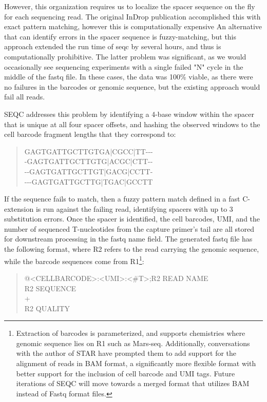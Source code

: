 However, this organization requires us to localize the spacer sequence on the fly for each sequencing read. 
The original InDrop publication accomplished this with exact pattern matching, however this is computationally expensive
An alternative that can identify errors in the spacer sequence is fuzzy-matching, but this approach extended the run time of seqc by several hours, and thus is computationally prohibitive.  
The latter problem was significant, as we would occasionally see sequencing experiments with a single failed "N" cycle in the middle of the fastq file. 
In these cases, the data was 100\% viable, as there were no failures in the barcodes or genomic sequence, but the existing approach would fail all reads. 

SEQC addresses this problem by identifying a 4-base window within the spacer that is unique at all four spacer offsets, and hashing the observed windows to the cell barcode fragment lengths that they correspond to: 
\begin{quote}
\onehalfspacing
{\mono
  GAGTGATTGCTTGTGA|CGCC|TT-{}-{}-\\ %
  -GAGTGATTGCTTGTG|ACGC|CTT-{}-\\ 
  -{}-GAGTGATTGCTTGT|GACG|CCTT-\\ 
  -{}-{}-GAGTGATTGCTTG|TGAC|GCCTT
}
\end{quote}
If the sequence fails to match, then a fuzzy pattern match defined in a fast C-extension is run against the failing read, identifying spacers with up to 3 substitution errors. 
Once the spacer is identified, the cell barcodes, UMI, and the number of sequenced T-nucleotides from the capture primer's tail are all stored for downstream processing in the fastq name field. 
The generated fastq file has the following format, where {\mono R2} refers to the read carrying the genomic sequence, while the barcode sequences come from R1\footnote{Extraction of barcodes is parameterized, and supports chemistries where genomic sequence lies on R1 such as Mars-seq. Additionally, conversations with the author of STAR have prompted them to add support for the alignment of reads in BAM format, a significantly more flexible format with better support for the inclusion of cell barcode and UMI tags. Future iterations of SEQC will move towards a merged format that utilizes BAM instead of Fastq format files.}:
\begin{quote}
\onehalfspacing
{\mono
  @<CELLBARCODE>:<UMI>:<\#T>;R2 READ NAME\\ 
  R2 SEQUENCE\\
  +\\
  R2 QUALITY
}
\end{quote}

